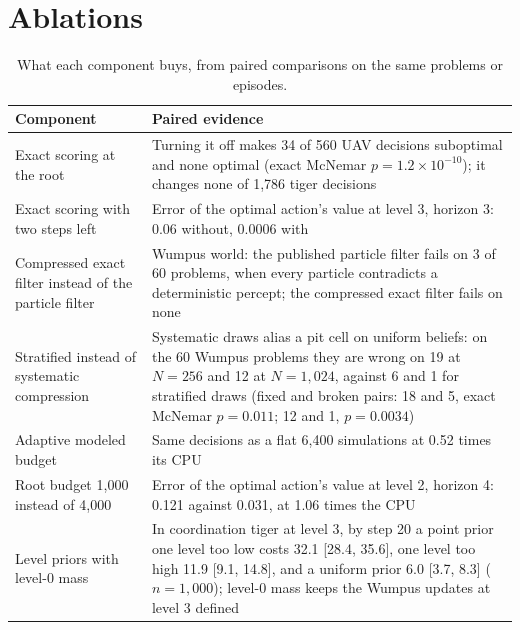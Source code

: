 \documentclass{article}
\begin{document}
\section{Ablations}

\begin{table}[h]
\centering
\small
\begin{tabular}{@{}p{}p{}@{}}
\toprule
Component & Paired evidence \\
\midrule
Exact scoring at the root & Turning it off makes 34 of 560 UAV decisions suboptimal and none optimal (exact McNemar $p = 1.2 \times 10^{-10}$); it changes none of 1{,}786 tiger decisions \\
Exact scoring with two steps left & Error of the optimal action's value at level 3, horizon 3: 0.06 without, 0.0006 with \\
Compressed exact filter instead of the particle filter & Wumpus world: the published particle filter fails on 3 of 60 problems, when every particle contradicts a deterministic percept; the compressed exact filter fails on none \\
Stratified instead of systematic compression & Systematic draws alias a pit cell on uniform beliefs: on the 60 Wumpus problems they are wrong on 19 at $N = 256$ and 12 at $N = 1{,}024$, against 6 and 1 for stratified draws (fixed and broken pairs: 18 and 5, exact McNemar $p = 0.011$; 12 and 1, $p = 0.0034$) \\
Adaptive modeled budget & Same decisions as a flat 6{,}400 simulations at 0.52 times its CPU \\
Root budget 1{,}000 instead of 4{,}000 & Error of the optimal action's value at level 2, horizon 4: 0.121 against 0.031, at 1.06 times the CPU \\
Level priors with level-0 mass & In coordination tiger at level 3, by step 20 a point prior one level too low costs 32.1 [28.4, 35.6], one level too high 11.9 [9.1, 14.8], and a uniform prior 6.0 [3.7, 8.3] ($n = 1{,}000$); level-0 mass keeps the Wumpus updates at level 3 defined \\
\bottomrule
\end{tabular}
\caption{What each component buys, from paired comparisons on the same problems or episodes.}
\label{tab:ablations}
\end{table}
\end{document}

